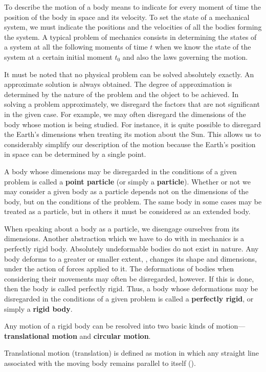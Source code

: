 To describe the motion of a body means to indicate for every moment of time the position of the body in space and its velocity. To set the state of a mechanical system, we must indicate the positions and the velocities of all the bodies forming the system. A typical problem of mechanics consists in determining the states of a system at all the following moments of time $t$ when we know the state of the system at a certain initial moment $t_0$ and also the laws governing the motion.

It must be noted that no physical problem can be solved absolutely exactly. An approximate solution is always obtained. The degree of approximation is determined by the nature of the problem and the object to be achieved. In solving a problem approximately, we disregard the factors that are not significant in the given case. For example, we may often disregard the dimensions of the body whose motion is being studied. For instance, it is quite possible to disregard the Earth's dimensions when treating its motion about the Sun. This allows us to considerably simplify our description of the motion because the Earth's position in space can be determined by a single point.

A body whose dimensions may be disregarded in the conditions of a given problem is called a \textbf{point particle} (or simply a \textbf{particle}). Whether or not we may consider a given body as a particle depends not on the dimensions of the body, but on the conditions of the problem. The same body in some cases may be treated as a particle, but in others it must be considered as an extended body.

When speaking about a body as a particle, we disengage ourselves from its dimensions. Another abstraction which we have to do with in mechanics is a perfectly rigid body. Absolutely undeformable bodies do not exist in nature. Any body deforms to a greater or smaller extent, \ie, changes its shape and dimensions, under the action of forces applied to it. The deformations of bodies when considering their movements may often be disregarded, however. If this is done, then the body is called perfectly rigid. Thus, a body whose deformations may be disregarded in the conditions of a given problem is called a \textbf{perfectly rigid}, or simply a \textbf{rigid body}.

Any motion of a rigid body can be resolved into two basic kinds of motion---\textbf{transla\-tional motion} and \textbf{circular motion}.

Translational motion (translation) is defined as motion in which any straight line associated with the moving body remains parallel to itself ().

